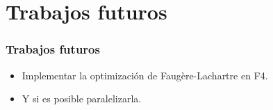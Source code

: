 \documentclass[spanish, aspectratio=169, hidecontrols]{beamer}
\begin{document}
\section{Trabajos futuros}


\begin{frame}
  \frametitle{Trabajos futuros}
  \begin{itemize}
    \item Implementar la optimización de Faugère-Lachartre en F4.
    \item Y si es posible paralelizarla.
  \end{itemize}
\end{frame}
\end{document}
